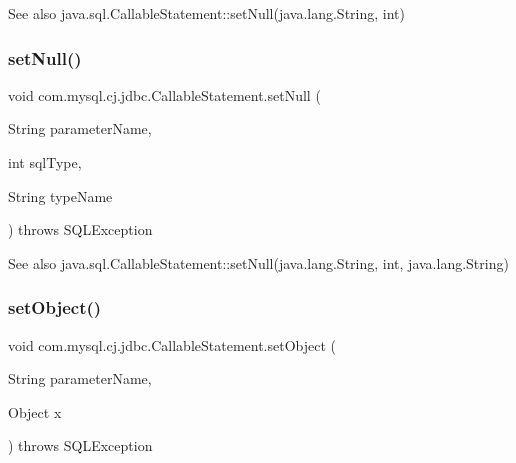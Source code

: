 \begin{DoxySeeAlso}{See also}
java.\+sql.\+Callable\+Statement\+::set\+Null(java.\+lang.\+String, int) 
\end{DoxySeeAlso}
\mbox{\label{classcom_1_1mysql_1_1cj_1_1jdbc_1_1_callable_statement_a3358832780f6cdacf23551c4321bf35f}} 
\subsubsection{\texorpdfstring{set\+Null()}{setNull()}\hspace{0.1cm}{\footnotesize\ttfamily [2/2]}}
{\footnotesize\ttfamily void com.\+mysql.\+cj.\+jdbc.\+Callable\+Statement.\+set\+Null (\begin{DoxyParamCaption}\item[{String}]{parameter\+Name,  }\item[{int}]{sql\+Type,  }\item[{String}]{type\+Name }\end{DoxyParamCaption}) throws S\+Q\+L\+Exception}

\begin{DoxySeeAlso}{See also}
java.\+sql.\+Callable\+Statement\+::set\+Null(java.\+lang.\+String, int, java.\+lang.\+String) 
\end{DoxySeeAlso}
\mbox{\label{classcom_1_1mysql_1_1cj_1_1jdbc_1_1_callable_statement_a2a37988196c65bd7d26890a1fe33281b}} 
\subsubsection{\texorpdfstring{set\+Object()}{setObject()}\hspace{0.1cm}{\footnotesize\ttfamily [1/3]}}
{\footnotesize\ttfamily void com.\+mysql.\+cj.\+jdbc.\+Callable\+Statement.\+set\+Object (\begin{DoxyParamCaption}\item[{String}]{parameter\+Name,  }\item[{Object}]{x }\end{DoxyParamCaption}) throws S\+Q\+L\+Exception}


